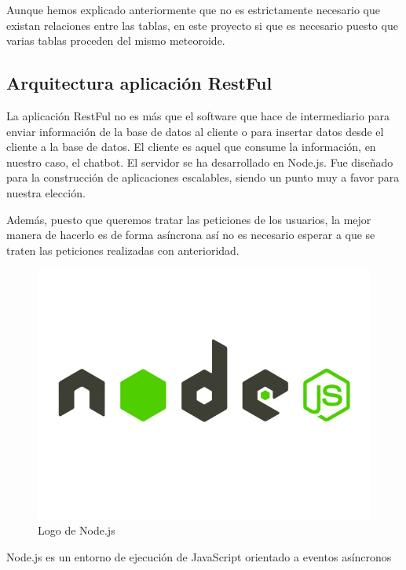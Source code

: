 Aunque hemos explicado anteriormente que no es estrictamente necesario que existan relaciones entre las tablas, en este proyecto si que es necesario puesto que varias tablas proceden del mismo meteoroide.



\subsection{Arquitectura aplicación RestFul}

La aplicación RestFul no es más que el software que hace de intermediario para enviar información de la base de datos al cliente o para insertar datos desde el cliente a la base de datos. El cliente es aquel que consume la información, en nuestro caso, el chatbot. El servidor se ha desarrollado en Node.js. Fue diseñado para la construcción de aplicaciones escalables, siendo un punto muy a favor para nuestra elección. 

Además, puesto que queremos tratar las peticiones de los usuarios, la mejor manera de hacerlo es de forma asíncrona así no es necesario esperar a que se traten las peticiones realizadas con anterioridad.


\begin{figure}[h]
    \centering
    \includegraphics[scale=0.2]{include/figuras/node.jpg}
    \caption{Logo de Node.js}
    \label{fig:node}
\end{figure}

Node.js es un entorno de ejecución de JavaScript \cite{javascript} orientado a eventos asíncronos


\subsection{}

